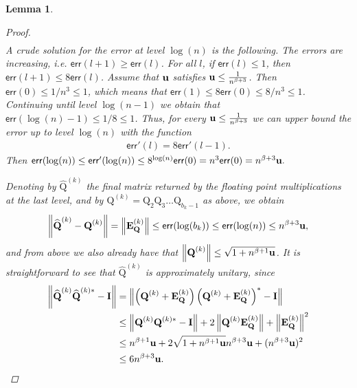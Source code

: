 \documentclass{article}
\newcommand{\lnorm}{\left\|}
\newcommand{\rnorm}{\right\|}
\newcommand{\lpar}{\left(}
\newcommand{\rpar}{\right)}
\newtheorem{lemma}{Lemma}[section]
\newcommand\matE{\boldsymbol{\mathrm{E}}}
\newcommand\matI{\boldsymbol{\mathrm{I}}}
\newcommand\matQ{\boldsymbol{\mathrm{Q}}}
\newcommand\matQhat{\widehat{\boldsymbol{\mathrm{Q}}}}
\newcommand{\umach}{\textbf{\textup{u}}}
\newcommand{\cmm}{\beta}
\newcommand{\err}{\mathsf{err}}
\begin{document}
\begin{lemma}
\begin{proof}
\begin{align*}
        \end{align*}
        A crude solution for the error at level $\log(n)$ is the following. 
        The errors are increasing, i.e. $\err(l+1)\geq \err(l)$. 
        For all $l$, if $\err(l)\leq 1$, then $\err(l+1)\leq 8\err(l)$. Assume that $\umach$ satisfies $\umach \leq \frac{1}{n^{\cmm+3}}$. Then $\err(0)\leq 1/n^3 \leq 1$, which means that $\err(1)\leq 8\err(0)\leq 8/n^3\leq 1$. Continuing until level $\log(n-1)$ we obtain that $\err(\log(n)-1)\leq 1/8\leq 1$. Thus, for every $\umach \leq \frac{1}{n^{\cmm+3}}$ we can upper bound the error up to level $\log(n)$ with the function
        \begin{align*}
            \err'(l) = 8\err'(l-1).
        \end{align*}
        Then $\err(\log(n))\leq \err'(\log(n)) \leq  8^{\log(n)}\err(0)=n^3\err(0)=n^{\cmm+3}\umach.$
        
        Denoting by $\matQhat^{(k)}$ the final matrix returned by the floating point multiplications at the last level, and by $\matQ^{(k)}=\matQ_2\matQ_3\ldots\matQ_{b_k-1}$ as above,  we obtain
        \begin{align*}
            \lnorm
                \matQhat^{(k)} - \matQ^{(k)}
            \rnorm
            =
            \lnorm
                \matE^{(k)}_{\matQ}
            \rnorm
            \leq
            \err(\log(b_k))\leq \err(\log(n)) \leq n^{\cmm+3}\umach,
        \end{align*}
        and from above we also already have that $\lnorm \matQ^{(k)} \rnorm \leq \sqrt{1+n^{\cmm+1}\umach}$. 
        It is straightforward to see that $\matQhat^{(k)}$ is approximately unitary, since
        \begin{align}
        \lnorm \matQhat^{(k)}\matQhat^{(k)*}-\matI \rnorm
        &=
            \lnorm 
                \lpar \matQ^{(k)}+\matE^{(k)}_{\matQ}\rpar
                \lpar \matQ^{(k)}+\matE^{(k)}_{\matQ}\rpar^*
                -
                \matI 
            \rnorm
            \nonumber
        \\
            &\leq
            \lnorm
            \matQ^{(k)}\matQ^{(k)*}
            -\matI
            \rnorm
            +
            2\lnorm \matQ^{(k)}\matE^{(k)}_{\matQ} \rnorm
            +
            \lnorm \matE^{(k)}_{\matQ} \rnorm ^2
            \nonumber
        \\
            &\leq
            n^{\beta+1}\umach  +
            2 \sqrt{1+n^{\cmm+1}\umach} n^{\cmm+3}\umach
            +
            (n^{\cmm+3}\umach)^2
            \nonumber
        \\
            &\leq
            6n^{\beta+3}\umach.
        \label{eq:bandwidth_halving_lemma_error_q_k}
        \end{align}


\end{proof}
\end{lemma}
\end{document}
